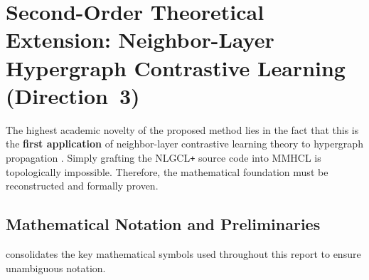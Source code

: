     \section[Neighbor-Layer Hypergraph Contrastive Learning]%
            {Second-Order Theoretical Extension: Neighbor-Layer Hypergraph Contrastive Learning (Direction~3)}
    
    The highest academic novelty of the proposed method lies in the fact that this is the \textbf{first application} of neighbor-layer contrastive learning theory to hypergraph propagation \cite{guo2025mmhcl, feng2025nlgcl, he2023dynamicweightedhypergraph}. Simply grafting the NLGCL\texttt{+} source code into MMHCL is topologically impossible. Therefore, the mathematical foundation must be reconstructed and formally proven.
    
    \subsection{Mathematical Notation and Preliminaries}
    
     consolidates the key mathematical symbols used throughout this report to ensure unambiguous notation.
    
